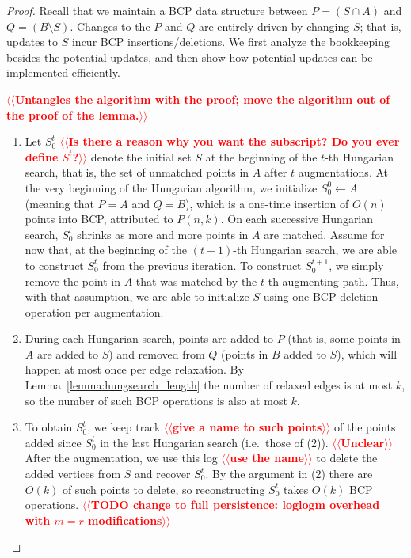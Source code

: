 \documentclass[11pt]{article}
\makeatletter
\theoremstyle{plain}
\numberwithin{figure}{section}
\def\n@te#1{\textsf{\boldmath \textbf{$\langle\!\langle$#1$\rangle\!\rangle$}}\leavevmode}
\def\note#1{\textcolor{red}{\n@te{#1}}}
\makeatother
\begin{document}
\begin{proof}
Recall that we maintain a BCP data structure between $P = (S \cap A)$ and
$Q = (B \setminus S)$.
Changes to the $P$ and $Q$ are entirely driven by changing $S$; that is,
updates to $S$ incur BCP insertions/deletions.
We first analyze the bookkeeping besides the potential updates, and then
show how potential updates can be implemented efficiently.

\note{Untangles the algorithm with the proof; move the algorithm out of the proof of the lemma.}

\begin{enumerate}
\item Let $S^t_0$ \note{Is there a reason why you want the subscript?  Do you ever define $S^t$?} denote the initial set $S$ at the beginning of the
	$t$-th Hungarian search, that is, the set of unmatched points in $A$
	after $t$ augmentations.
	At the very beginning of the Hungarian algorithm, we initialize
	$S^0_0 \gets A$ (meaning that $P = A$ and $Q = B$), which is a
	one-time insertion of $O(n)$ points into BCP, attributed to $P(n, k)$.
	On each successive Hungarian search, $S^t_0$ shrinks as more
	and more points in $A$ are matched.
	Assume for now that, at the beginning of the $(t+1)$-th
	Hungarian search, we are able to construct $S^t_0$ from the
	previous iteration.
	To construct $S^{t+1}_0$, we simply remove the point in $A$ that was
	matched by the $t$-th augmenting path.
	Thus, with that assumption, we are able to initialize $S$ using
	one BCP deletion operation per augmentation.

\item During each Hungarian search, points are added to $P$ (that is, some points in $A$ are
	added to $S$) and removed from $Q$ (points in $B$ added to $S$), which will happen at most once per edge relaxation.
	By Lemma~\ref{lemma:hungsearch_length} the number of relaxed
	edges is at most $k$, so the number of such BCP operations is
	also at most $k$.

\item To obtain $S^t_0$, we keep track \note{give a name to such points} of the
	points added since $S^t_0$ in the last Hungarian search
	(i.e.\ those of (2)). \note{Unclear}
	After the augmentation, we use this log \note{use the name} to delete the added
	vertices from $S$ and recover $S^t_0$.
	By the argument in (2) there are $O(k)$ of such points to
	delete, so reconstructing $S^t_0$ takes $O(k)$ BCP operations.
	\note{TODO change to full persistence: loglogm overhead with $m=r$ modifications} %
\end{enumerate}


\end{proof}
\end{document}

